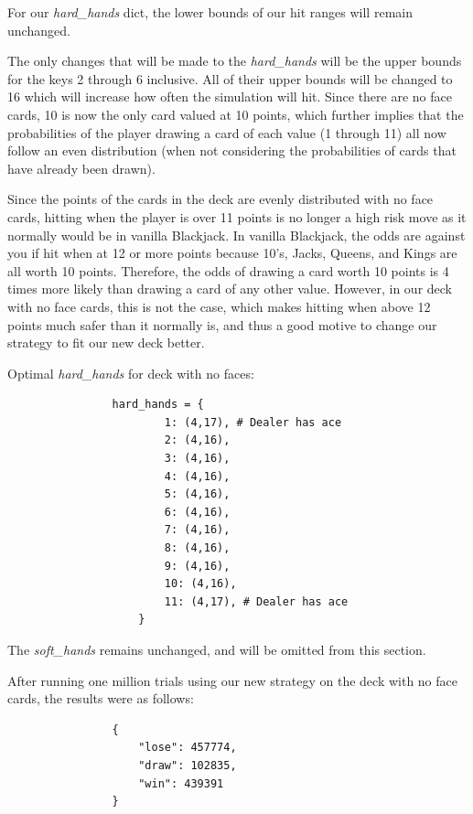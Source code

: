 \documentclass{article}
\begin{document}
		{\parindent0pt %
			For our \textit{hard\_hands} dict, the lower bounds of our hit ranges will remain unchanged. 

			The only changes that will be made to the \textit{hard\_hands} will be the upper bounds for the keys 2 through 6 inclusive.
			All of their upper bounds will be changed to 16 which will increase how often the simulation will hit. 
			Since there are no face cards, 10 is now the only card valued at 10 points,
			which further implies that the probabilities of the player drawing a card of each value (1 through 11) all now follow an even 
			distribution (when not considering the probabilities of cards that have already been drawn). 

			Since the points of the cards in the deck are evenly distributed with no face cards, hitting when the player is over 11 points 
			is no longer a high risk move as it normally would be in vanilla Blackjack. In vanilla Blackjack, the odds are against you if hit when 
			at 12 or more points because 10's, Jacks, Queens, and Kings are all worth 10 points. Therefore, the odds of drawing a card worth 
			10 points is 4 times more likely than drawing a card of any other value. However, in our deck with no face cards, this is not the case,
			which makes hitting when above 12 points much safer than it normally is, and thus a good motive to change our strategy to fit our new
			deck better.


        
        
		Optimal \textit{hard\_hands} for deck with no faces:
        \begin{verbatim}
                hard_hands = {
                        1: (4,17), # Dealer has ace
                        2: (4,16),
                        3: (4,16),
                        4: (4,16),
                        5: (4,16),
                        6: (4,16),
                        7: (4,16),
                        8: (4,16),
                        9: (4,16),
                        10: (4,16),
                        11: (4,17), # Dealer has ace
                    }
        \end{verbatim}

		
		The \textit{soft\_hands} remains unchanged, and will be omitted from this section.

        After running one million trials using our new strategy on the deck with no face cards, the results
		were as follows:

        \begin{verbatim}
                {
                    "lose": 457774,
                    "draw": 102835,
                    "win": 439391
                }
        \end{verbatim}

}
\end{document}
